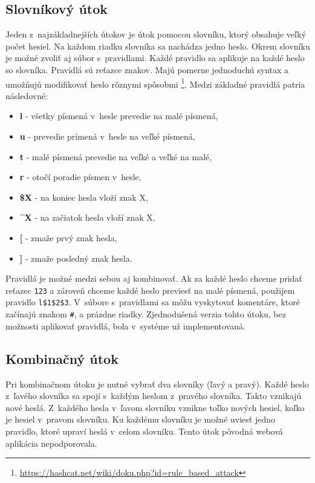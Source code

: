\documentclass[slovak]{fitthesis}
\begin{document}
\subsection{Slovníkový útok} \label{dictAttack}
Jeden z~najzákladnejších útokov je útok pomocou slovníku, ktorý obsahuje veľký počet hesiel. Na každom riadku slovníka sa nachádza jedno heslo. Okrem slovníku je možné zvoliť aj súbor s~pravidlami. Každé pravidlo sa aplikuje na každé heslo so slovníka. Pravidlá sú reťazce znakov. Majú pomerne jednoduchú syntax a umožňujú modifikovať heslo rôznymi spôsobmi \footnote{\url{https://hashcat.net/wiki/doku.php?id=rule_based_attack}}. Medzi základné pravidlá patria následovné:
\begin{itemize}
    \item \textbf{l} - všetky písmená v~hesle prevedie na malé písmená,
    \item \textbf{u} - prevedie prímená v~hesle na veľké písmená,
    \item \textbf{t} - malé písmená prevedie na veľké a veľké na malé,
    \item \textbf{r} - otočí poradie písmen v~hesle,
    \item \textbf{\$X} - na koniec hesla vloží znak X,
    \item \textbf{\^{}X} - na začiatok hesla vloží znak X,
    \item \textbf{[} - zmaže prvý znak hesla,
    \item \textbf{]} - zmaže posledný znak hesla.
\end{itemize}
Pravidlá je možné medzi sebou aj kombinovať. Ak za každé heslo chceme pridať reťazec \texttt{123} a zároveň chceme každé heslo previesť na malé písmená, použijem pravidlo \texttt{l\$1\$2\$3}. V~súbore s~pravidlami sa môžu vyskytovať komentáre, ktoré začínajú znakom \texttt{\#}, a prázdne riadky.
Zjednodušená verzia tohto útoku, bez možnosti aplikovať pravidlá, bola v~systéme už implementovaná.

\subsection{Kombinačný útok} \label{combAttack}
Pri kombinačnom útoku je nutné vybrať dva slovníky (ľavý a pravý). Každé heslo z~ľavého slovníka sa spojí s~každým heslom z~pravého slovníka. Takto vznikajú nové heslá. Z~každého hesla v~ľavom slovníku vznikne toľko nových hesiel, koľko je hesiel v~pravom slovníku. Ku každému slovníku je možné uviesť jedno pravidlo, ktoré upraví heslá v~celom slovníku. Tento útok pôvodná webová aplikácia nepodporovala.
\end{document}
